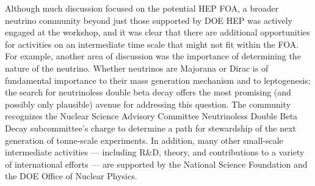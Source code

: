 Although much discussion focused on the potential HEP FOA, a broader
neutrino community beyond just those supported by DOE HEP was actively
engaged at the workshop, and it was clear that there are additional
opportunities for activities on an intermediate time scale that might
not fit within the FOA.  For example, another area of discussion was
the importance of determining the nature of the neutrino.  Whether
neutrinos are Majorana or Dirac is of fundamental importance to their
mass generation mechanism and to leptogenesis; the search for
neutrinoless double beta decay offers the most promising (and possibly
only plausible) avenue for addressing this question.  The community
recognizes the Nuclear Science Advisory Committee Neutrinoless Double
Beta Decay subcommittee's charge to determine a path for stewardship
of the next generation of tonne-scale experiments.  In addition, many
other small-scale intermediate activities --- including R\&D, theory,
and contributions to a variety of international efforts --- are
supported by the National Science Foundation and the DOE Office of
Nuclear Physics.









